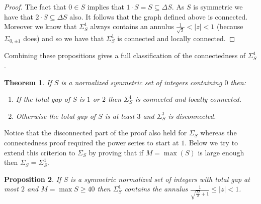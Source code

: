 \documentclass[11pt]{amsart}
\newtheorem{theorem}{Theorem}
\newtheorem{proposition}[theorem]{Proposition}
\numberwithin{theorem}{section} %
\numberwithin{corollary}{section}
\numberwithin{lemma}{section}
\numberwithin{proposition}{section}
\numberwithin{definition}{section}
\begin{document}
\begin{proof}

The fact that $0 \in S$ implies that $1 \cdot S = S \subseteq \Delta S$. As $S$ is symmetric we have that $2 \cdot S \subseteq \Delta S$ also. It follows that the graph defined above is connected. Moreover we know that $\Sigma^1_S$ always contains an annulus $\frac{1}{\sqrt{2}} < |z| < 1$ (because $\Sigma_{0, \pm 1}$ does) and so we have that $\Sigma^1_S$ is connected and locally connected. 

\end{proof}

Combining these propositions gives a full classification of the connectedness of $\Sigma_S^1$. 


\begin{theorem}
If $S$ is a normalized symmetric set of integers containing $0$ then:

	\begin{enumerate}
		\item If the total gap of $S$ is $1$ or $2$ then $\Sigma_S^1$ is connected and locally connected.
		\item Otherwise the total gap of $S$ is at least $3$ and $\Sigma_S^1$ is disconnected.
	\end{enumerate}
\end{theorem}


Notice that the disconnected part of the proof also held for $\Sigma_S$ whereas the connectedness proof required the power series to start at $1$. Below we try to extend this criterion to $\Sigma_S$ by proving that if $M = \max(S)$ is large enough then $\Sigma_S = \Sigma_S^1$. 



\begin{proposition}
If $S$ is a symmetric normalized set of integers with total gap at most $2$ and $M = \max{S} \geqslant 40$ then $\Sigma_S^1$ contains the annulus $\frac{1}{\sqrt{\frac{M}{2}} + 1} \leqslant |z| < 1$.
\end{proposition}
\end{document}
